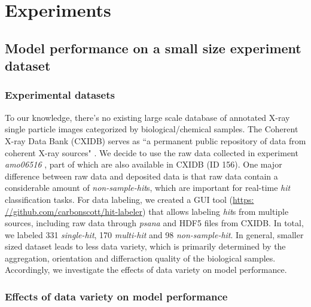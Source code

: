 \section{Experiments}

\subsection{Model performance on a small size experiment dataset}

\subsubsection{Experimental datasets}

To our knowledge, there's no existing large scale database of annotated X-ray
single particle images categorized by biological/chemical samples.  The Coherent
X-ray Data Bank (CXIDB) serves as ``a permanent public repository of data from
coherent X-ray sources" \cite{maiaCoherentXrayImaging2012}.  We decide to use
the raw data collected in experiment \textit{amo06516}
\cite{liDiffractionDataAerosolized2020}, part of which are also available in
CXIDB (ID 156).  One major difference between raw data and deposited data is
that raw data contain a considerable amount of \textit{non-sample-hit}s,
which are important for real-time \textit{hit} classification tasks.  For data labeling,
we created a GUI tool (\url{https:
//github.com/carbonscott/hit-labeler}) that allows labeling \textit{hit}s from multiple
 sources, including raw data through \textit{psana}
 \cite{damianiLinacCoherentLight2016} and HDF5 files from CXIDB.  In total, we
 labeled 331 \textit{single-hit}, 170 \textit{multi-hit} and 98
 \textit{non-sample-hit}.  In general, smaller sized dataset leads to less data
 variety, which is primarily determined by the aggregation, orientation and
 differaction quality of the biological samples.  Accordingly, we investigate
 the effects of data variety on model performance.  


\subsubsection{Effects of data variety on model performance}


